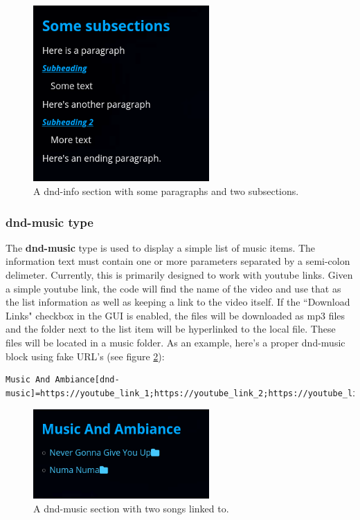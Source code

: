 \begin{figure}[h]
	\centering
	\includegraphics[width=0.6\textwidth]{images/dnd-info-section-03.png}
	\caption{A dnd-info section with some paragraphs and two subsections.}
	\label{fig:dnd-info-fig-3}
\end{figure}

\subsubsection{dnd-music type}

The \textbf{dnd-music} type is used to display a simple list of music items. The information text must contain one or more parameters separated by a semi-colon delimeter. Currently, this is primarily designed to work with youtube links. Given a simple youtube link, the code will find the name of the video and use that as the list information as well as keeping a link to the video itself. If the ``Download Links" checkbox in the GUI is enabled, the files will be downloaded as mp3 files and the folder next to the list item will be hyperlinked to the local file. These files will be located in a music folder. As an example, here's a proper dnd-music block using fake URL's (see figure \ref{fig:dnd-music-fig}):

\begin{lstlisting}
Music And Ambiance[dnd-music]=https://youtube_link_1;https://youtube_link_2;https://youtube_link_3
\end{lstlisting}

\begin{figure}[h]
	\centering
	\includegraphics[width=0.6\textwidth]{images/dnd-music-section.png}
	\caption{A dnd-music section with two songs linked to.}
	\label{fig:dnd-music-fig}
\end{figure}


